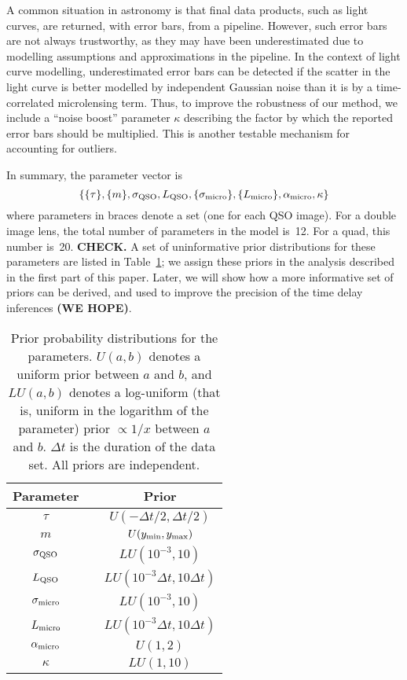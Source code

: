 \documentclass[useAMS,usenatbib, a4paper]{mn2e} \usepackage{natbib}
\begin{document}
A common situation in astronomy is that final data products, such as light
curves, are returned, with error bars, from a pipeline. However, such error
bars are not always trustworthy, as they may have been underestimated due to
modelling assumptions and approximations in the pipeline. In the context of
light curve modelling, underestimated error bars can be detected if the
scatter in the light curve is better modelled by independent Gaussian noise
than it is by a time-correlated microlensing term. Thus, to improve the
robustness of our method, we include a ``noise boost'' parameter $\kappa$
describing the factor by which the reported error bars should be multiplied.
This is another testable mechanism for accounting for outliers.

In summary, the parameter vector is
\begin{equation}
\left\{ \{\tau\}, \{m\}, \sigma_{\rm QSO}, L_{\rm QSO}, \{\sigma_{\rm micro}\}, \{L_{\rm micro}\}, \alpha_{\rm micro}, \kappa \right\}
\end{equation}
where parameters in braces denote a set (one for each QSO image).  For a
double image lens, the total number of parameters in the model is~12. For a
quad, this number is~20. {\bf CHECK.}  A set of uninformative prior
distributions for these parameters are listed in Table~\ref{priors}; we assign
these priors in the analysis described in the first part of this paper. Later,
we will show how a more informative set of priors can be derived, and used to
improve the precision of the time delay inferences {\bf (WE HOPE)}.

\begin{table}
\begin{center}
\begin{tabular}{ccc}
Parameter & \vline & Prior \\
\hline
$\tau$ & \vline & $U(-\Delta t/2, \Delta t/2)$ \\ 
$m$ & \vline & $U(y_{\rm min}, y_{\rm max})$ \\
$\sigma_{\rm QSO}$ & \vline & $LU(10^{-3}, 10)$ \\
$L_{\rm QSO}$ & \vline & $LU(10^{-3}\Delta t, 10\Delta t)$ \\
$\sigma_{\rm micro}$ & \vline & $LU(10^{-3}, 10)$ \\
$L_{\rm micro}$ & \vline & $LU(10^{-3}\Delta t, 10\Delta t)$ \\
$\alpha_{\rm micro}$ & \vline & $U(1, 2)$ \\
$\kappa$ & \vline & $LU(1, 10)$
\end{tabular}
\end{center}
\caption{Prior probability distributions for the parameters. $U(a, b)$ denotes
a uniform prior between $a$ and $b$, and $LU(a, b)$ denotes a log-uniform
(that is, uniform in the logarithm of the parameter) prior $\propto 1/x$
between $a$ and $b$. $\Delta t$ is the duration of the data set. All priors
are independent.\label{priors}}
\end{table}
\end{document}
